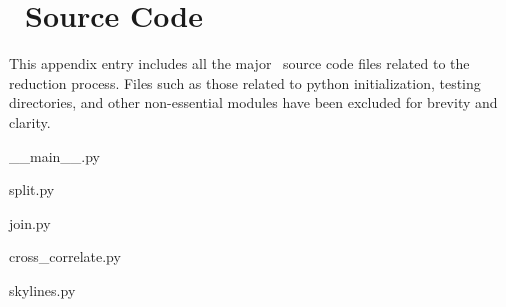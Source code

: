 \chapter{\stops\ Source Code} \label{app:code}

This appendix entry includes all the major \stops\ source code files related to the reduction process. Files such as those related to python initialization, testing directories, and other non-essential modules have been excluded for brevity and clarity.


{__main__.py}
\clearpage


{split.py}
\clearpage


{join.py}
\clearpage


{cross_correlate.py}
\clearpage


{skylines.py}
